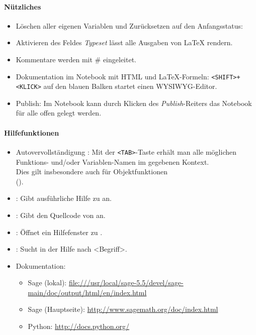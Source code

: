 \documentclass[a4paper,9pt,DIV15,twocolumn]{scrartcl}
\begin{document}
\paragraph{Nützliches}
\begin{itemize}
\item Löschen aller eigenen Variablen und Zurücksetzen auf den Anfangsstatus: {\color{blue} }
\item Aktivieren des Feldes \emph{Typeset} lässt alle Ausgaben von \LaTeX{} rendern.
\item Kommentare werden mit \# eingeleitet.
\item Dokumentation im Notebook mit HTML und \LaTeX{}-Formeln: {\color{blue} \verb~<SHIFT>+<KLICK>~ }auf den blauen Balken startet einen WYSIWYG-Editor.
\item Publish: Im Notebook kann durch Klicken des \emph{Publish}-Reiters das Notebook für alle offen gelegt werden. 
\end{itemize}

\paragraph{Hilfefunktionen}
\begin{itemize}
\item {\color{blue} Autovervollständigung :} Mit der {\color{blue} \verb~<TAB>~}-Taste erhält man alle möglichen Funktions- und/oder Variablen-Namen im gegebenen Kontext.\\
Dies gilt insbesondere auch für Objektfunktionen\\ ().
\item {\color{blue}  :} Gibt ausführliche Hilfe zu  an.
\item {\color{blue}  :} Gibt den Quellcode von  an.
\item {\color{blue}  :} Öffnet ein Hilfefenster zu .
\item {\color{blue}  :} Sucht in der Hilfe nach <Begriff>.
\item Dokumentation:
\begin{itemize}
    \item Sage (lokal): {\small\url{file:///usr/local/sage-5.5/devel/sage-main/doc/output/html/en/index.html}}
    \item Sage (Hauptseite): {\small\url{http://www.sagemath.org/doc/index.html}}
\item Python: \url{http://docs.python.org/}
\end{itemize}
\end{itemize}
\end{document}
